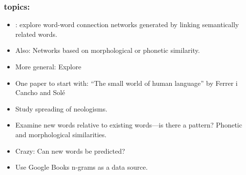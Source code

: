 \begin{frame}
  \frametitle{topics:}

  \begin{block}{}
  \begin{itemize}
  \item<1->
    : explore word-word
    connection networks generated by linking semantically related words.
  \item<2->
    Also: Networks based on morphological or phonetic similarity.
  \item<3-> 
    More general: Explore 
  \item<4->
    One paper to start with: ``The small world of human language''
    by Ferrer i Cancho and Sol\'{e}\cite{ferrericancho2001a}
  \item<5-> 
    Study spreading of
    neologisms.
  \item<6-> 
    Examine new words relative to existing words---is there 
    a pattern?  Phonetic and morphological similarities.
  \item<7-> 
    \alert{Crazy:} Can new words be predicted?
  \item<8-> 
    Use Google Books n-grams as a data source.
  \end{itemize}
  \end{block}

\end{frame}


